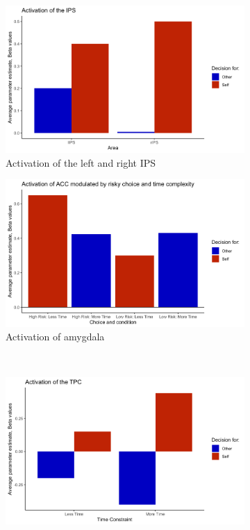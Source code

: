 \documentclass[11pt]{article}
\begin{document}
\begin{figure}
\centering
  \begin{subfigure}[b]{0.4\textwidth}
    \includegraphics[width=\textwidth]{figures/IPS.png}
    \caption{Activation of the left and right IPS}
    \label{fig:3a}
  \end{subfigure}
  \begin{subfigure}[b]{0.4\textwidth}
    \includegraphics[width=\textwidth]{figures/acc.png}
    \caption{Activation of amygdala}
    \label{fig:3b}
  \end{subfigure}\\
  \begin{subfigure}[b]{0.4\textwidth}
    \includegraphics[width=\textwidth]{figures/tpc.png}

\end{subfigure}
\end{figure}
\end{document}
